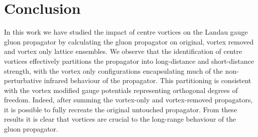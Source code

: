
\chapter{Conclusion}\label{chapter:Conclusions}

\ifpdf
    \graphicspath{{Chapter8/Figs/Raster/}{Chapter8/Figs/PDF/}{Chapter8/Figs/}}
\else
    \graphicspath{{Chapter8/Figs/Vector/}{Chapter8/Figs/}}
\fi

In this work we have studied the impact of centre vortices on the Landau gauge gluon propagator by calculating the gluon propagator on original, vortex removed and vortex only lattice ensembles. We observe that the identification of centre vortices effectively partitions the propagator into long-distance and short-distance strength, with the vortex only configurations encapsulating much of the non-perturbative infrared behaviour of the propagator. This partitioning is consistent with the vortex modified gauge potentials representing orthogonal degrees of freedom. Indeed, after summing the vortex-only and vortex-removed propagators, it is possible to fully recreate the original untouched propagator. From these results it is clear that vortices are crucial to the long-range behaviour of the gluon propagator.\\

